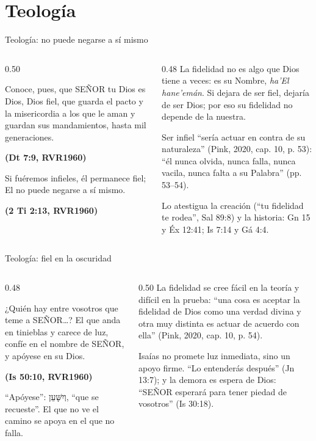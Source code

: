 \documentclass[hyperref={bookmarks=false},aspectratio=169]{beamer}
\newcommand{\heb}[1]{\mbox{\foreignlanguage{hebrew}{#1}}}
\newcommand{\SENOR}{S{\fontsize{0.78em}{1em}\selectfont EÑOR}}
\newcommand{\fuente}[1]{\par\hfill{\upshape\bfseries\footnotesize\textcolor{azul}{#1}}}
\begin{document}
\section{Teología}

\begin{frame}{Teología: no puede negarse a sí mismo}
\begin{columns}[t,onlytextwidth]
\begin{column}{0.50\textwidth}
\begin{cita}Conoce, pues, que \SENOR{} tu Dios es Dios, Dios fiel, que guarda el pacto y la misericordia a los que le aman y guardan sus mandamientos, hasta mil generaciones.\fuente{(Dt 7:9, RVR1960)}\end{cita}
\begin{cita}Si fuéremos infieles, él permanece fiel; El no puede negarse a sí mismo.\fuente{(2 Ti 2:13, RVR1960)}\end{cita}
\end{column}
\begin{column}{0.48\textwidth}\small
La fidelidad no es algo que Dios tiene a veces: es su Nombre, \emph{ha'El hane'emán}. Si dejara de ser fiel, dejaría de ser Dios; por eso su fidelidad no depende de la nuestra.\par\medskip
Ser infiel ``sería actuar en contra de su naturaleza'' (Pink, 2020, cap. 10, p. 53): ``él nunca olvida, nunca falla, nunca vacila, nunca falta a su Palabra'' (pp. 53--54).\par\medskip
Lo atestigua la creación (``tu fidelidad te rodea'', Sal 89:8) y la historia: Gn 15 y Éx 12:41; Is 7:14 y Gá 4:4.
\end{column}
\end{columns}
\end{frame}

\begin{frame}{Teología: fiel en la oscuridad}
\begin{columns}[t,onlytextwidth]
\begin{column}{0.48\textwidth}
\begin{cita}¿Quién hay entre vosotros que teme a \SENOR\ldots? El que anda en tinieblas y carece de luz, confíe en el nombre de \SENOR, y apóyese en su Dios.\fuente{(Is 50:10, RVR1960)}\end{cita}
\scriptsize ``Apóyese'': \heb{וְיִשָּׁעֵן}, ``que se recueste''. El que no ve el camino se apoya en el que no falla.
\end{column}
\begin{column}{0.50\textwidth}\small
La fidelidad se cree fácil en la teoría y difícil en la prueba: ``una cosa es aceptar la fidelidad de Dios como una verdad divina y otra muy distinta es actuar de acuerdo con ella'' (Pink, 2020, cap. 10, p. 54).\par\medskip
Isaías no promete luz inmediata, sino un apoyo firme. ``Lo entenderás después'' (Jn 13:7); y la demora es espera de Dios: ``\SENOR{} esperará para tener piedad de vosotros'' (Is 30:18).
\end{column}
\end{columns}
\end{frame}
\end{document}
